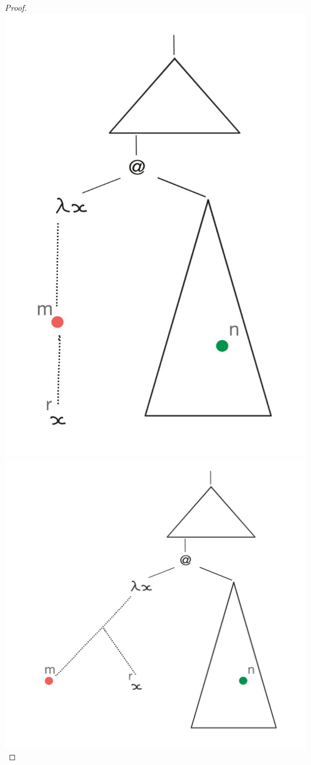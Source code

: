 \begin{proof}
$\qquad\qquad\quad$\includegraphics[scale=.15]{MyPic12.jpg}\includegraphics[scale=.15]{MyPic13.jpg}


\end{proof}

